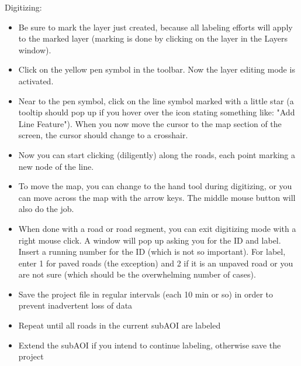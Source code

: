 \documentclass[12pt,a4paper]{scrartcl}
\begin{document}
Digitizing:
\begin{itemize}
	\item Be sure to mark the layer just created, because all labeling efforts will apply to the marked layer (marking is done by clicking on the layer in the Layers window). 
	\item Click on the yellow pen symbol in the toolbar. Now the layer editing mode is activated.
	\item Near to the pen symbol, click on the line symbol marked with a little star (a tooltip should pop up if you hover over the icon stating something like: "Add Line Feature").  
	When you now move the cursor to the map section of the screen, the cursor should change to a crosshair.
	\item Now you can start clicking (diligently) along the roads, each point marking a new node of the line. 
	\item To move the map, you can change to the hand tool during digitizing, or you can move across the map with the arrow keys. The middle mouse button will also do the job.
	\item When done with a road or road segment, you can exit digitizing mode with a right mouse click. A window will pop up asking you for the ID and label. Insert a running number for the ID (which is not so important). For label, enter 1 for paved roads (the exception) and 2 if it is an unpaved road or you are not sure (which should be the overwhelming number of cases).
	\item Save the project file in regular intervals (each 10 min or so) in order to prevent inadvertent loss of data
	\item Repeat until all roads in the current subAOI are labeled
	\item Extend the subAOI if you intend to continue labeling, otherwise save the project
\end{itemize}
\end{document}
